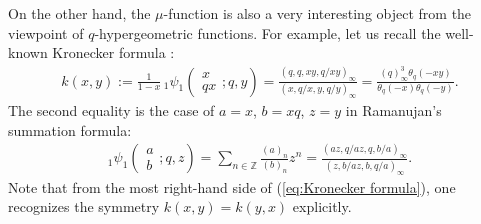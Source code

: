 \documentclass[pdftex]{sigma}
\numberwithin{equation}{section}
\theoremstyle{definition}
\begin{document}
On the other hand, the $\mu$-function is also a very interesting object from the viewpoint of $q$-hypergeometric functions.
For example, let us recall the well-known Kronecker formula \cite{W}:
\begin{gather}
\label{eq:Kronecker formula}
k(x,y)
 :=
 \frac{1}{1-x}\, {_{1}\psi _1}\left(\begin{matrix} x \\ qx \end{matrix};q,y\right)
 =
 \frac{(q,q,xy,q/xy)_{\infty}}{(x,q/x,y,q/y)_{\infty}}
 =
 \frac{(q)_{\infty }^{3}\theta _{q}(-xy)}{\theta _{q}(-x)\theta _{q}(-y)}.
\end{gather}
The second equality is the case of $a=x$, $b=xq$, $z=y$ in Ramanujan's summation formula:
\begin{gather*}
{_{1}\psi _1}\left(\begin{matrix} a \\ b \end{matrix};q,z\right)
 =
 \sum_{n \in \mathbb{Z}}
 \frac{(a)_{n}}{(b)_{n}}z^{n}
 =
 \frac{(az,q/az,q,b/a)_{\infty}}{(z,b/az,b,q/a)_{\infty}}.
\end{gather*}
Note that from the most right-hand side of (\ref{eq:Kronecker formula}), one recognizes the symmetry $k(x,y)=k(y,x)$ explicitly.
\end{document}
